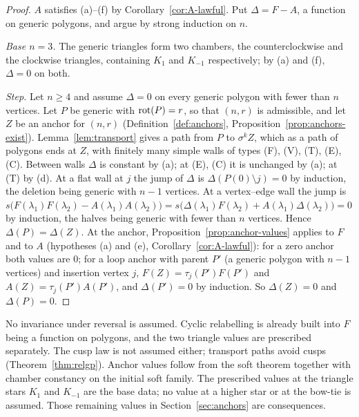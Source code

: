 \begin{proof}
$A$ satisfies (a)--(f) by Corollary~\ref{cor:A-lawful}. Put $\Delta=F-A$, a
function on generic polygons, and argue by strong induction on $n$.

\emph{Base $n=3$.} The generic triangles form two chambers, the
counterclockwise and the clockwise triangles, containing $K_1$ and $K_{-1}$
respectively; by (a) and (f), $\Delta=0$ on both.

\emph{Step.} Let $n\geq4$ and assume $\Delta=0$ on every generic polygon with
fewer than $n$ vertices. Let $P$ be generic with $\operatorname{rot}(P)=r$, so that $(n,r)$
is admissible, and let $Z$ be an anchor for $(n,r)$
(Definition~\ref{def:anchors}, Proposition~\ref{prop:anchors-exist}).
Lemma~\ref{lem:transport} gives a path from $P$ to $\sigma^kZ$, which as a
path of polygons ends at $Z$, with finitely many simple walls of types (F),
(V), (T), (E), (C). Between walls $\Delta$ is constant by (a); at (E), (C) it
is unchanged by (a); at (T) by (d). At a flat wall at $j$ the jump of
$\Delta$ is $\Delta(P(0)\setminus j)=0$ by induction, the deletion being
generic with $n-1$ vertices. At a vertex--edge wall the jump is
$s\bigl(F(\lambda_1)F(\lambda_2)-A(\lambda_1)A(\lambda_2)\bigr)
=s\bigl(\Delta(\lambda_1)F(\lambda_2)+A(\lambda_1)\Delta(\lambda_2)\bigr)=0$
by induction, the halves being generic with fewer than $n$ vertices. Hence
$\Delta(P)=\Delta(Z)$. At the anchor, Proposition~\ref{prop:anchor-values}
applies to $F$ and to $A$ (hypotheses (a) and (e),
Corollary~\ref{cor:A-lawful}):
for a zero anchor both values are $0$; for a loop anchor with parent $P'$
(a generic polygon with $n-1$ vertices) and insertion vertex $j$,
$F(Z)=\tau_j(P')F(P')$ and $A(Z)=\tau_j(P')A(P')$, and $\Delta(P')=0$ by
induction. So $\Delta(Z)=0$ and $\Delta(P)=0$.
\end{proof}

\begin{remark}
No invariance under reversal is assumed. Cyclic relabelling is already
built into $F$ being a function on polygons, and the two triangle values
are prescribed separately. The cusp law is not assumed either; transport
paths avoid cusps (Theorem~\ref{thm:relgp}). Anchor values follow from the
soft theorem together with chamber constancy on the initial soft family.
The prescribed values at the triangle stars $K_1$ and $K_{-1}$ are the
base data; no value at a higher star or at the bow-tie is assumed.
Those remaining values in Section~\ref{sec:anchors} are consequences.
\end{remark}

